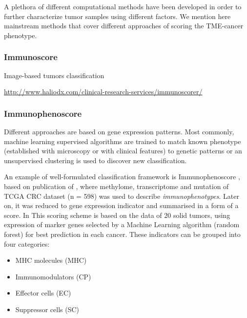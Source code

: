 \documentclass[12pt,]{book}
\providecommand{\tightlist}{%
  \setlength{\itemsep}{0pt}\setlength{\parskip}{0pt}}
\theoremstyle{definition}
\theoremstyle{definition}
\theoremstyle{definition}
\theoremstyle{remark}
\begin{document}
A plethora of different computational methods have been developed in
order to further characterize tumor samples using different factors. We
mention here mainstream methods that cover different approaches of
scoring the TME-cancer phenotype.

\hypertarget{immunoscore}{%
\subsubsection{Immunoscore}\label{immunoscore}}

Image-based tumors classification

\url{http://www.haliodx.com/clinical-research-services/immunoscorer/}

\citet{Galon2012}

\hypertarget{immunophenoscore}{%
\subsubsection{Immunophenoscore}\label{immunophenoscore}}

Different approaches are based on gene expression patterns. Most
commonly, machine learning supervised algorithms are trained to match
known phenotype (established with microscopy or with clinical features)
to genetic patterns or an unsupervised clustering is used to discover
new classification.

An example of well-formulated classification framework is
Immunophenoscore \citep{Charoentong2017}, based on publication of
\citet{Angelova2015}, where methylome, transcriptome and mutation of
TCGA CRC dataset (n = 598) was used to describe \emph{immunophenotypes}.
Later on, it was reduced to gene expression indicator and summarised in
a form of a score. In This scoring scheme is based on the data of 20
solid tumors, using expression of marker genes selected by a Machine
Learning algorithm (random forest) for best prediction in each cancer.
These indicators can be grouped into four categories:

\begin{itemize}
\tightlist
\item
  MHC molecules (MHC)
\item
  Immunomodulators (CP)
\item
  Effector cells (EC)
\item
  Suppressor cells (SC)
\end{itemize}
\end{document}
